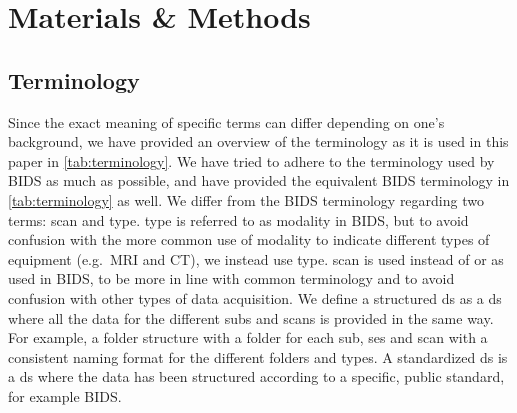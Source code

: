 \section{Materials \& Methods}
\subsection{Terminology}

Since the exact meaning of specific terms can differ depending on one's background, we have provided an overview of the terminology as it is used in this paper in \cref{tab:terminology}.
We have tried to adhere to the terminology used by \gls{BIDS} as much as possible, and have provided the equivalent \gls{BIDS} terminology in \cref{tab:terminology} as well.
We differ from the \gls{BIDS} terminology regarding two terms: \gls{scan} and \gls{type}.
\Gls{type} is referred to as modality in \gls{BIDS}, but to avoid confusion with the more common use of modality to indicate different types of equipment (e.g.\ \gls{MRI} and \gls{CT}), we instead use \gls{type}.
\Gls{scan} is used instead of  or  as used in \gls{BIDS}, to be more in line with common terminology and to avoid confusion with other types of data acquisition.
We define a structured \gls{ds} as a \gls{ds} where all the data for the different \glspl{sub} and \glspl{scan} is provided in the same way.
For example, a folder structure with a folder for each \gls{sub}, \gls{ses} and \gls{scan} with a consistent naming format for the different folders and \glspl{type}.
A standardized \gls{ds} is a \gls{ds} where the data has been structured according to a specific, public standard, for example \gls{BIDS}.


